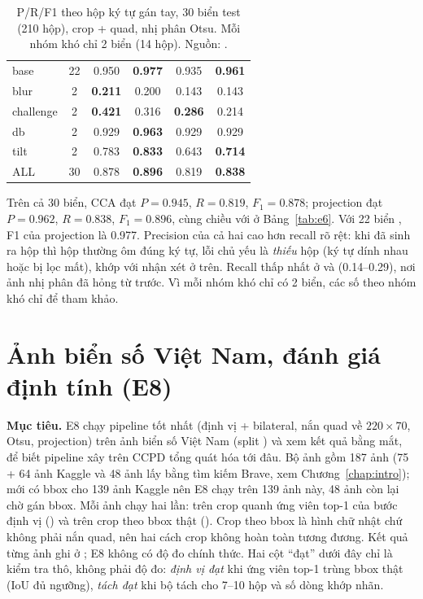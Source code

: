 \begin{table}[htbp]
\centering
\caption[P/R/F1 theo hộp ký tự gán tay (test)]{P/R/F1 theo hộp ký tự gán tay, 30 biển test (210 hộp), crop  + quad, nhị phân Otsu. Mỗi nhóm khó chỉ 2 biển (14 hộp). Nguồn: .}
\label{tab:charprf}
\small
{}
\begin{tabularx}{\textwidth}{lcCCCC}
\hline
{}  &  &  &  &  &  \\
\hline
base & 22 & 0.950 & \textbf{0.977} & 0.935 & \textbf{0.961} \\
blur & 2 & \textbf{0.211} & 0.200 & 0.143 & 0.143 \\
challenge & 2 & \textbf{0.421} & 0.316 & \textbf{0.286} & 0.214 \\
db & 2 & 0.929 & \textbf{0.963} & 0.929 & 0.929 \\
tilt & 2 & 0.783 & \textbf{0.833} & 0.643 & \textbf{0.714} \\
\hline
ALL & 30 & 0.878 & \textbf{0.896} & 0.819 & \textbf{0.838} \\
\hline
\end{tabularx}
\end{table}

Trên cả 30 biển, CCA đạt $P=0.945$, $R=0.819$, $F_1=0.878$; projection đạt $P=0.962$, $R=0.838$, $F_1=0.896$, cùng chiều với  ở Bảng~\ref{tab:e6}. Với 22 biển , F1 của projection là 0.977. Precision của cả hai cao hơn recall rõ rệt: khi đã sinh ra hộp thì hộp thường ôm đúng ký tự, lỗi chủ yếu là \emph{thiếu} hộp (ký tự dính nhau hoặc bị lọc mất), khớp với nhận xét ở trên. Recall thấp nhất ở  và  (0.14--0.29), nơi ảnh nhị phân đã hỏng từ trước. Vì mỗi nhóm khó chỉ có 2 biển, các số theo nhóm khó chỉ để tham khảo.

\section{Ảnh biển số Việt Nam, đánh giá định tính (E8)}
\label{sec:b-vn}

\textbf{Mục tiêu.} E8 chạy pipeline tốt nhất (định vị  + bilateral, nắn quad về $220\times 70$, Otsu, projection) trên ảnh biển số Việt Nam (split ) và xem kết quả bằng mắt, để biết pipeline xây trên CCPD tổng quát hóa tới đâu. Bộ ảnh gồm 187 ảnh (75 + 64 ảnh Kaggle và 48 ảnh lấy bằng tìm kiếm Brave, xem Chương~\ref{chap:intro}); mới có bbox cho 139 ảnh Kaggle nên E8 chạy trên 139 ảnh này, 48 ảnh còn lại chờ gán bbox. Mỗi ảnh chạy hai lần: trên crop quanh ứng viên top-1 của bước định vị () và trên crop theo bbox thật (). Crop theo bbox là hình chữ nhật chứ không phải nắn quad, nên hai cách crop không hoàn toàn tương đương. Kết quả từng ảnh ghi ở ; E8 không có độ đo chính thức. Hai cột ``đạt'' dưới đây chỉ là kiểm tra thô, không phải độ đo: \emph{định vị đạt} khi ứng viên top-1 trùng bbox thật (IoU đủ ngưỡng), \emph{tách đạt} khi bộ tách cho 7--10 hộp và số dòng khớp nhãn.

